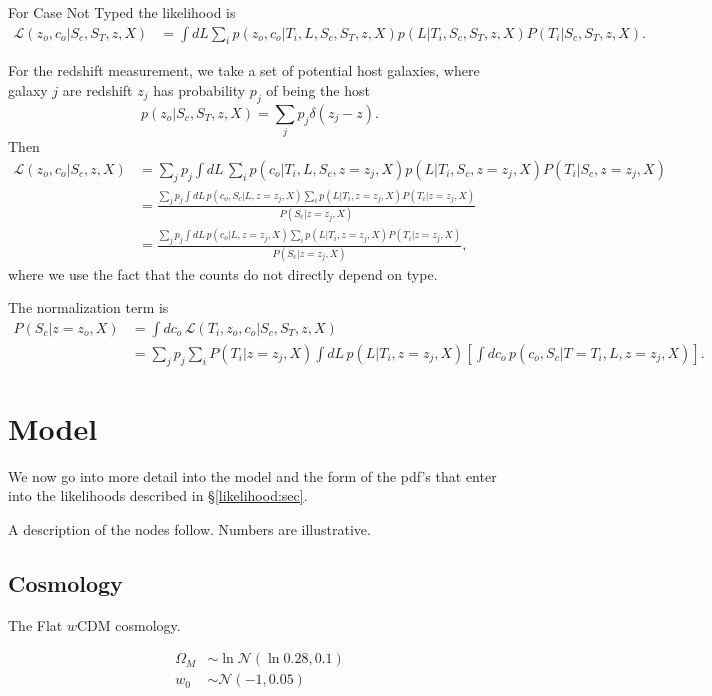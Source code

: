 \documentclass[preprint,3p]{elsarticle}
\begin{document}
For Case Not Typed the likelihood is
\begin{align}
\mathcal{L}(z_o,c_o | S_c, S_T, z, X) & =  \int dL \sum_i p(z_o,c_o | T_i, L, S_c, S_T, z, X) p(L |  T_i,  S_c, S_T, z, X) P(T_i|S_c, S_T, z, X).
\end{align}

For the redshift measurement, we take a set of potential host galaxies, where galaxy $j$
are redshift $z_j$ has probability $p_j$ of being the host
\begin{equation}
p(z_o|S_c, S_T, z, X) = \sum_j p_j\delta(z_j-z).
\end{equation}
Then
\begin{align}
\mathcal{L}(z_o,c_o | S_c, z, X) & =  \sum_j p_j \int dL \,\sum_{i} p(c_o | T_i, L, S_c, z=z_j, X) p(L |  T_i,  S_c,  z=z_j, X) P(T_i|S_c, z=z_j, X) \\
&=  \frac{\sum_j p_j \int dL \, p(c_o, S_c | L, z=z_j, X) \sum_{i}  p(L|T_i, z=z_j, X) P(T_i|z=z_j, X)   }{P(S_c| z=z_j, X)}\\
&=  \frac{\sum_j p_j \int dL \, p(c_o | L, z=z_j, X) \sum_{i}  p(L|T_i, z=z_j, X) P(T_i|z=z_j, X)   }{P(S_c| z=z_j, X)},
\end{align}
where we use the fact that the counts do not directly depend on type.

The normalization term is
\begin{align}
P(S_c| z=z_o, X) & = \int dc_o \, \mathcal{L}(T_i,z_o,c_o | S_c, S_T, z, X)\\
& =  \sum_j p_j  \sum_{i} P(T_i|z=z_j, X)  \int dL \, p(L|T_i, z=z_j, X) 
\left[ \int dc_o \, p(c_o, S_c| T=T_i, L, z=z_j, X) \right].
\end{align}



\section{Model}
\label{model:sec}

We now go into more detail into the model and the form of the pdf's that enter
into the likelihoods described in \S\ref{likelihood:sec}.

A description of the nodes follow.  Numbers are illustrative. 

\subsection{Cosmology}
The Flat $w$CDM cosmology.

\begin{align}
\Omega_M & \sim \ln{\mathcal{N}}(\ln{0.28},0.1)\\
w_0 & \sim \mathcal{N}(-1,0.05)
\end{align}
\end{document}
